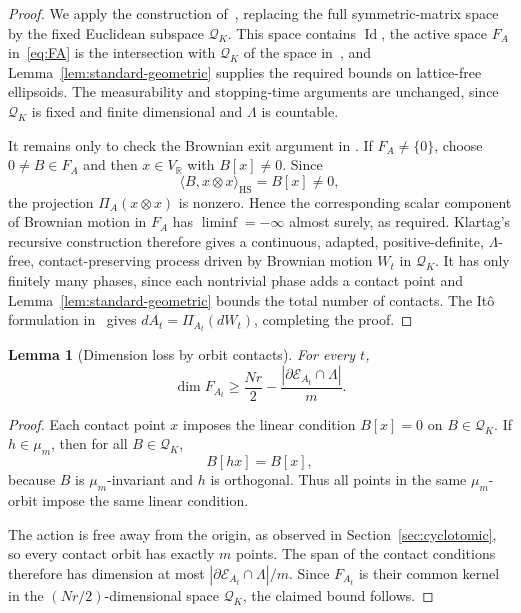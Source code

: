 \documentclass[11pt]{article}
\newtheorem{lemma}[theorem]{Lemma}
\theoremstyle{remark}
\newcommand{\R}{\mathbb R}
\newcommand{\Id}{\operatorname{Id}}
\newcommand{\HS}{\operatorname{HS}}
\newcommand{\calE}{\mathcal E}
\begin{document}
\begin{proof}
We apply the construction of~\cite[Lemmas~2.1 and~2.2,
Proposition~2.3, and Corollary~2.4]{Klartag}, replacing the full
symmetric-matrix space by the fixed Euclidean subspace $\mathcal Q_K$.  This
space contains $\Id$, the active space $F_A$ in~\eqref{eq:FA} is the
intersection with $\mathcal Q_K$ of the space in~\cite{Klartag}, and
Lemma~\ref{lem:standard-geometric} supplies the required bounds on lattice-free
ellipsoids.  The measurability and stopping-time arguments are unchanged,
since $\mathcal Q_K$ is fixed and finite dimensional and $\Lambda$ is
countable.

It remains only to check the Brownian exit argument in
\cite[Lemma~2.2]{Klartag}.  If $F_A\ne\{0\}$, choose $0\ne B\in F_A$ and then
$x\in V_\R$ with $B[x]\ne0$.  Since
\[
        \langle B,x\otimes x\rangle_{\HS}=B[x]\ne0,
\]
the projection $\Pi_A(x\otimes x)$ is nonzero.  Hence the corresponding
scalar component of Brownian motion in $F_A$ has $\liminf=-\infty$ almost
surely, as required.  Klartag's recursive construction therefore gives a
continuous, adapted, positive-definite, $\Lambda$-free, contact-preserving
process driven by Brownian motion $W_t$ in $\mathcal Q_K$.  It has only finitely many
phases, since each nontrivial phase adds a contact point and
Lemma~\ref{lem:standard-geometric} bounds the total number of contacts.
The It\^o formulation in~\cite[Corollary~2.4]{Klartag} gives
$dA_t=\Pi_{A_t}(dW_t)$, completing the proof.
\end{proof}

\begin{lemma}[Dimension loss by orbit contacts]\label{lem:Fdimension}
For every $t$,
\[
        \dim F_{A_t}\ge
        \frac{Nr}{2}-\frac{|\partial\calE_{A_t}\cap\Lambda|}{m}.
\]
\end{lemma}

\begin{proof}
Each contact point $x$ imposes the linear condition $B[x]=0$ on
$B\in\mathcal Q_K$.  If $h\in \mu_m$, then for all $B\in\mathcal Q_K$,
\[
        B[hx]=B[x],
\]
because $B$ is $\mu_m$-invariant and $h$ is orthogonal.  Thus all points in the same $\mu_m$-orbit impose the same linear condition.

The action is free away from the origin, as observed in
Section~\ref{sec:cyclotomic}, so every contact orbit has exactly $m$ points.
The span of the contact conditions therefore has dimension at most
$|\partial\calE_{A_t}\cap\Lambda|/m$.  Since $F_{A_t}$ is their common kernel
in the $(Nr/2)$-dimensional space $\mathcal Q_K$, the claimed bound follows.
\end{proof}
\end{document}
